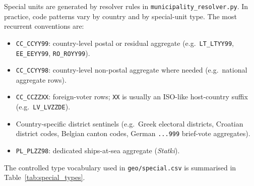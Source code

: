 Special units are generated by resolver rules in
\texttt{municipality\_resolver.py}.  In practice, code patterns vary by
country and by special-unit type.  The most recurrent conventions are:

\begin{itemize}
  \item \texttt{CC\_CCYY99}: country-level postal or residual aggregate
      (e.g.\ \texttt{LT\_LTYY99}, \texttt{EE\_EEYY99}, \texttt{RO\_ROYY99}).
  \item \texttt{CC\_CCYY98}: country-level non-postal aggregate where needed
      (e.g.\ national aggregate rows).
  \item \texttt{CC\_CCZZXX}: foreign-voter rows; \texttt{XX} is usually an
      ISO-like host-country suffix (e.g.\ \texttt{LV\_LVZZDE}).
  \item Country-specific district sentinels (e.g.\ Greek electoral districts,
      Croatian district codes, Belgian canton codes, German \texttt{...999}
      brief-vote aggregates).
  \item \texttt{PL\_PLZZ98}: dedicated ships-at-sea aggregate
      (\textit{Statki}).
\end{itemize}

The controlled type vocabulary used in \texttt{geo/special.csv} is
summarised in Table~\ref{tab:special_types}.

